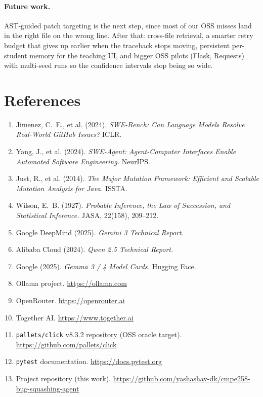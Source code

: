 \documentclass[11pt,letterpaper]{article}
\begin{document}
\paragraph{Future work.} AST-guided patch targeting is the next step, since most of our OSS misses land in the right file on the wrong line. After that: cross-file retrieval, a smarter retry budget that gives up earlier when the traceback stops moving, persistent per-student memory for the teaching UI, and bigger OSS pilots (Flask, Requests) with multi-seed runs so the confidence intervals stop being so wide.

\section*{References}

\begin{enumerate}
  \item Jimenez, C.~E., et al. (2024). \emph{SWE-Bench: Can Language Models Resolve Real-World GitHub Issues?} ICLR.
  \item Yang, J., et al. (2024). \emph{SWE-Agent: Agent-Computer Interfaces Enable Automated Software Engineering.} NeurIPS.
  \item Just, R., et al. (2014). \emph{The Major Mutation Framework: Efficient and Scalable Mutation Analysis for Java.} ISSTA.
  \item Wilson, E.~B. (1927). \emph{Probable Inference, the Law of Succession, and Statistical Inference.} JASA, 22(158), 209--212.
  \item Google DeepMind (2025). \emph{Gemini 3 Technical Report.}
  \item Alibaba Cloud (2024). \emph{Qwen 2.5 Technical Report.}
  \item Google (2025). \emph{Gemma 3 / 4 Model Cards.} Hugging Face.
  \item Ollama project. \url{https://ollama.com}
  \item OpenRouter. \url{https://openrouter.ai}
  \item Together AI. \url{https://www.together.ai}
  \item \texttt{pallets/click} v8.3.2 repository (OSS oracle target). \url{https://github.com/pallets/click}
  \item \texttt{pytest} documentation. \url{https://docs.pytest.org}
  \item Project repository (this work). \url{https://github.com/yashashav-dk/cmpe258-bug-squashing-agent}
\end{enumerate}
\end{document}
